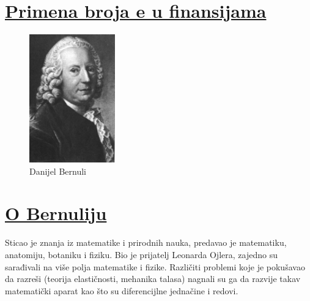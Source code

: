 \documentclass{article}
\begin{document}
\section*{\uline{Primena broja e u finansijama}}
\begin{figure}
  \begin{center}
    \includegraphics[width=0.33\textwidth]{bernuli.jpg}
  \end{center}
  \caption{Danijel Bernuli}
\end{figure}
\paragraph{}
\section*{\uline{O Bernuliju}}
Sticao je znanja iz matematike i prirodnih nauka, predavao je matematiku, anatomiju, botaniku i fiziku. Bio je prijatelj Leonarda Ojlera, zajedno su sarađivali na više polja matematike i fizike. Različiti problemi koje je pokušavao da razreši (teorija elastičnosti, mehanika talasa) nagnali su ga da razvije takav matematički aparat kao što su diferencijlne jednačine i redovi.
\end{document}
